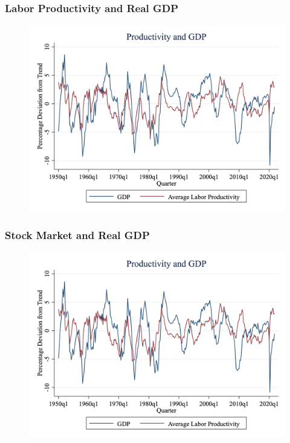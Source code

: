 \documentclass{beamer}
\begin{document}
\begin{frame}
\frametitle[alignment=center]{Labor Productivity and Real GDP}
\begin{figure}
\centering
\includegraphics[scale=0.25]{Figures/Fig_3pt15.png}
\end{figure}
\end{frame}

\begin{frame}
\frametitle[alignment=center]{Stock Market and Real GDP}
\begin{figure}
\centering
\includegraphics[scale=0.25]{Figures/Fig_3pt15.png}
\end{figure}
\end{frame}
\end{document}
